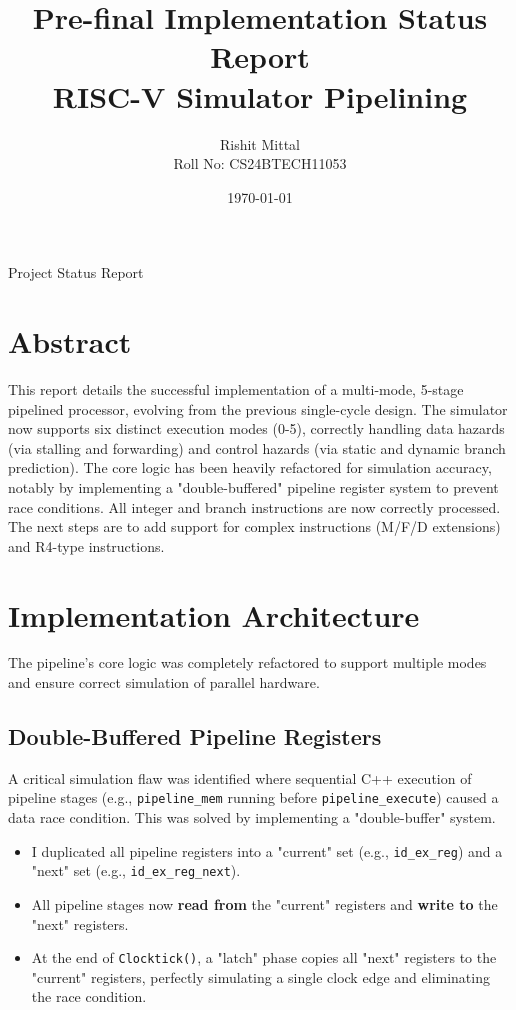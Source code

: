 \documentclass[11pt, a4paper]{article}
\title{
    \sffamily\bfseries\huge %
    Pre-final Implementation Status Report \vspace{0.25cm} \\ %
    \Large RISC-V Simulator Pipelining
}
\author{\sffamily Rishit Mittal \\ Roll No: CS24BTECH11053}
\date{\sffamily \today}
\begin{document}
\begin{titlepage}
    \maketitle
    \vfill
    \begin{center}
        \sffamily\large
        Project Status Report
    \end{center}
\end{titlepage}

\section*{Abstract}
\noindent
This report details the successful implementation of a multi-mode, 5-stage pipelined processor, evolving from the previous single-cycle design. The simulator now supports six distinct execution modes (0-5), correctly handling data hazards (via stalling and forwarding) and control hazards (via static and dynamic branch prediction). The core logic has been heavily refactored for simulation accuracy, notably by implementing a "double-buffered" pipeline register system to prevent race conditions. All integer and branch instructions are now correctly processed. The next steps are to add support for complex instructions (M/F/D extensions) and R4-type instructions.

\section{Implementation Architecture}

The pipeline's core logic was completely refactored to support multiple modes and ensure correct simulation of parallel hardware.

\subsection{Double-Buffered Pipeline Registers}
A critical simulation flaw was identified where sequential C++ execution of pipeline stages (e.g., \texttt{pipeline\_mem} running before \texttt{pipeline\_execute}) caused a data race condition. This was solved by implementing a "double-buffer" system.
\begin{itemize}[leftmargin=*]
    \item I duplicated all pipeline registers into a "current" set (e.g., \texttt{id\_ex\_reg}) and a "next" set (e.g., \texttt{id\_ex\_reg\_next}).
    \item All pipeline stages now \textbf{read from} the "current" registers and \textbf{write to} the "next" registers.
    \item At the end of \texttt{Clocktick()}, a "latch" phase copies all "next" registers to the "current" registers, perfectly simulating a single clock edge and eliminating the race condition.
\end{itemize}
\end{document}
